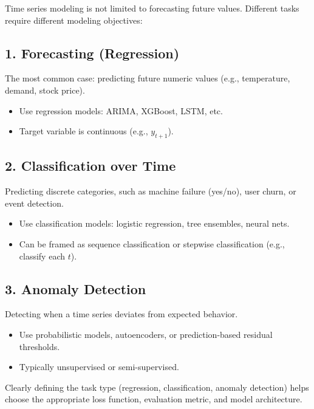 \documentclass[12pt,openany]{book}
\begin{document}
Time series modeling is not limited to forecasting future values. Different tasks require different modeling objectives:


\subsection*{1. Forecasting (Regression)}

The most common case: predicting future numeric values (e.g., temperature, demand, stock price).

\begin{itemize}
    \item Use regression models: ARIMA, XGBoost, LSTM, etc.
    \item Target variable is continuous (e.g., $y_{t+1}$).
\end{itemize}


\subsection*{2. Classification over Time}

Predicting discrete categories, such as machine failure (yes/no), user churn, or event detection.

\begin{itemize}
    \item Use classification models: logistic regression, tree ensembles, neural nets.
    \item Can be framed as sequence classification or stepwise classification (e.g., classify each $t$).
\end{itemize}


\subsection*{3. Anomaly Detection}

Detecting when a time series deviates from expected behavior.

\begin{itemize}
    \item Use probabilistic models, autoencoders, or prediction-based residual thresholds.
    \item Typically unsupervised or semi-supervised.
\end{itemize}

\begin{notebox}
Clearly defining the task type (regression, classification, anomaly detection) helps choose the appropriate loss function, evaluation metric, and model architecture.
\end{notebox}
\end{document}

